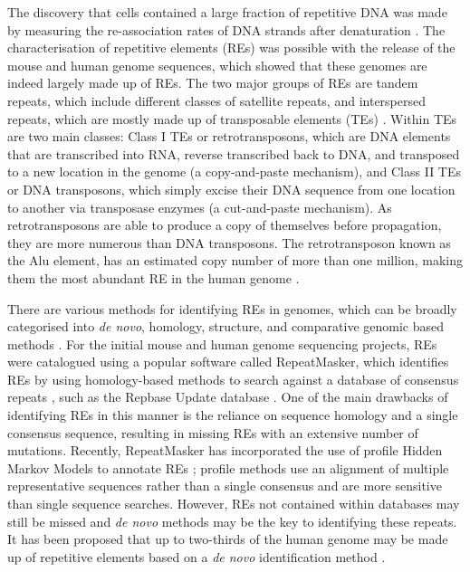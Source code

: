 The discovery that cells contained a large fraction of repetitive DNA was made by measuring the re-association rates of DNA strands after denaturation \citep{Britten1968}. The characterisation of repetitive elements (REs) was possible with the release of the mouse \citep{pmid12466850} and human \citep{venter2001sequence, lander2001initial} genome sequences, which showed that these genomes are indeed largely made up of REs. The two major groups of REs are tandem repeats, which include different classes of satellite repeats, and interspersed repeats, which are mostly made up of transposable elements (TEs) \citep{pmid9666329}. Within TEs are two main classes: Class I TEs or retrotransposons, which are DNA elements that are transcribed into RNA, reverse transcribed back to DNA, and transposed to a new location in the genome (a copy-and-paste mechanism), and Class II TEs or DNA transposons, which simply excise their DNA sequence from one location to another via transposase enzymes (a cut-and-paste mechanism). As retrotransposons are able to produce a copy of themselves before propagation, they are more numerous than DNA transposons. The retrotransposon known as the Alu element, has an estimated copy number of more than one million, making them the most abundant RE in the human genome \citep{lander2001initial}.

There are various methods for identifying REs in genomes, which can be broadly categorised into \textit{de novo}, homology, structure, and comparative genomic based methods \citep{Bergman01112007}. For the initial mouse and human genome sequencing projects, REs were catalogued using a popular software called RepeatMasker, which identifies REs by using homology-based methods to search against a database of consensus repeats \citep{pmid19274634}, such as the Repbase Update database \citep{pmid16093699}. One of the main drawbacks of identifying REs in this manner is the reliance on sequence homology and a single consensus sequence, resulting in missing REs with an extensive number of mutations. Recently, RepeatMasker has incorporated the use of profile Hidden Markov Models to annotate REs \citep{pmid23203985}; profile methods use an alignment of multiple representative sequences rather than a single consensus and are more sensitive than single sequence searches. However, REs not contained within databases may still be missed and \textit{de novo} methods may be the key to identifying these repeats. It has been proposed that up to two-thirds of the human genome may be made up of repetitive elements based on a \textit{de novo} identification method \citep{pmid22144907}.

